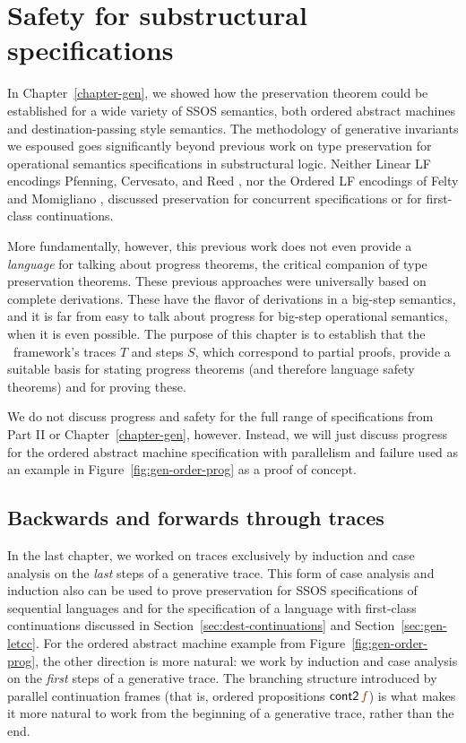 \chapter{Safety for substructural specifications}
\label{chapter-safety}

In Chapter~\ref{chapter-gen}, we showed how the preservation theorem
could be established for a wide variety of SSOS semantics, both
ordered abstract machines and destination-passing style semantics.
The methodology of generative invariants we espoused goes
significantly beyond previous work on type preservation for
operational semantics specifications in substructural logic.  Neither
Linear LF encodings Pfenning, Cervesato, and Reed
\cite{cervesato02linear,reed09hybrid}, nor the Ordered LF encodings of
Felty and Momigliano \cite{felty12hybrid}, discussed preservation for
concurrent specifications or for first-class continuations. 

More fundamentally, however, this previous work does not even provide
a {\it language} for talking about progress theorems, the critical
companion of type preservation theorems.  These previous approaches
were universally based on complete derivations. These have the flavor
of derivations in a big-step semantics, and it is far from easy to
talk about progress for big-step operational semantics, when it is
even possible. The purpose of this chapter is to establish that the
\sls~framework's traces $T$ and steps $S$, which correspond to partial
proofs, provide a suitable basis for stating progress theorems (and
therefore language safety theorems) and for proving these. 

We do not discuss progress and safety for the full range of
specifications from Part II or Chapter~\ref{chapter-gen},
however. Instead, we will just discuss progress for the ordered
abstract machine specification with parallelism and failure used as an
example in Figure~\ref{fig:gen-order-prog} as a proof of concept.

\section{Backwards and forwards through traces}

In the last chapter, we worked on traces exclusively by induction and
case analysis on the {\it last} steps of a generative trace.  This
form of case analysis and induction also can be used to prove
preservation for SSOS specifications of sequential languages and for
the specification of a language with first-class continuations
discussed in Section~\ref{sec:dest-continuations} and
Section~\ref{sec:gen-letcc}. For the ordered abstract machine example
from Figure~\ref{fig:gen-order-prog}, the other direction is more
natural: we work by induction and case analysis on the {\it first}
steps of a generative trace. The branching structure introduced by
parallel continuation frames (that is, ordered propositions ${\sf
  cont2}\,\lf{f}$) is what makes it more natural to work from the
beginning of a generative trace, rather than the end.

